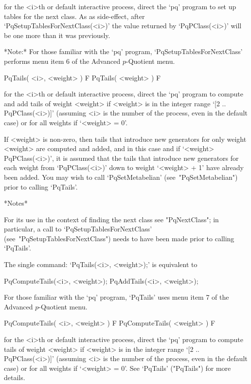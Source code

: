 for the <i>th or default interactive {\ANUPQ} process,  direct  the  `pq'
program  to  set  up  tables  for  the  next  class.  As  as  side-effect,
after   `PqSetupTablesForNextClass(<i>)'   the    value    returned    by
`PqPClass(<i>)' will be one more than it was previously.

*Note:* 
For those familiar  with  the  `pq'  program,  `PqSetupTablesForNextClass'
performs menu item 6 of the Advanced $p$-Quotient menu.

\>PqTails( <i>, <weight> ) F
\>PqTails( <weight> ) F

for the <i>th or default interactive {\ANUPQ} process,  direct  the  `pq'
program to compute and add tails of weight <weight> if <weight> is in  the
integer range `[2 .. PqPClass(<i>)]' (assuming <i> is the number  of  the
process, even in the default case) or for all weights if `<weight> = 0'.

If <weight> is non-zero, then tails that  introduce  new  generators  for
only weight <weight> are computed and added, and  in  this  case  and  if
`<weight> \< PqPClass(<i>)', it is assumed that the tails that  introduce
new generators for  each  weight  from  `PqPClass(<i>)'  down  to  weight
`<weight>  +  1'  have  already  been  added.  You  may  wish   to   call
`PqSetMetabelian' (see~"PqSetMetabelian") prior to calling `PqTails'.

*Notes*

For its use in the context of finding the next class  see  "PqNextClass";
in     particular,     a     call     to      `PqSetupTablesForNextClass'
(see~"PqSetupTablesForNextClass")  needs  to  have  been  made  prior  to
calling `PqTails'.

The single command: `PqTails(<i>, <weight>);' is equivalent to

PqComputeTails(<i>, <weight>);
PqAddTails(<i>, <weight>);

For those familiar with the `pq' program, `PqTails' uses menu  item  7  of
the Advanced $p$-Quotient menu.

\>PqComputeTails( <i>, <weight> ) F
\>PqComputeTails( <weight> ) F

for the <i>th or default interactive {\ANUPQ} process,  direct  the  `pq'
program to compute tails of weight <weight> if <weight> is in the  integer
range `[2 .. PqPClass(<i>)]' (assuming <i> is the number of the  process,
even in the default case) or for all  weights  if  `<weight>  =  0'.  See
`PqTails' ("PqTails") for more details.

